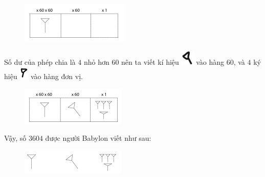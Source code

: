 \begin{multicols}{2}
	\begin{figure}[H]
		\centering
		\vspace*{-5pt}
		\captionsetup{labelformat= empty, justification=centering}
		\includegraphics[width=0.65\linewidth]{25}
		\vspace*{-10pt}
	\end{figure}
	Số dư của phép chia là $4$ nhỏ hơn $60$ nên ta viết kí hiệu \includegraphics[scale=0.6]{15.1} vào hàng $60$, và $4$ ký hiệu \includegraphics[scale=0.7]{15} vào hàng đơn vị. 
	\begin{figure}[H]
		\centering
		\vspace*{-5pt}
		\captionsetup{labelformat= empty, justification=centering}
		\includegraphics[width=0.65\linewidth]{26}
		\vspace*{-10pt}
	\end{figure}
	Vậy, số $3604$ được người Babylon viết như sau:
	\begin{figure}[H]
		\centering
		\vspace*{-5pt}
		\captionsetup{labelformat= empty, justification=centering}
		\includegraphics[width=0.65\linewidth]{27}
		\vspace*{-10pt}
	\end{figure}

\end{multicols}
